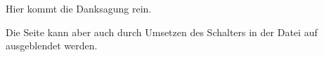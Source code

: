 \chapter*{\TransAcknowledgements}
%
%
%
\markboth{\TransAcknowledgements}{\TransAcknowledgements}
%
%
Hier kommt die Danksagung rein.

Die Seite kann aber auch durch Umsetzen des Schalters
in der Datei 
auf  ausgeblendet werden.